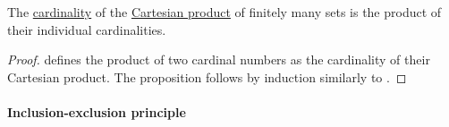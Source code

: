 \begin{theorem}\label{thm:cardinality_product_rule}
  The \hyperref[thm:cardinality_existence]{cardinality} of the \hyperref[def:cartesian_product]{Cartesian product} of finitely many sets is the product of their individual cardinalities.
\end{theorem}
\begin{proof}
   defines the product of two cardinal numbers as the cardinality of their Cartesian product. The proposition follows by induction similarly to .
\end{proof}

\paragraph{Inclusion-exclusion principle}

